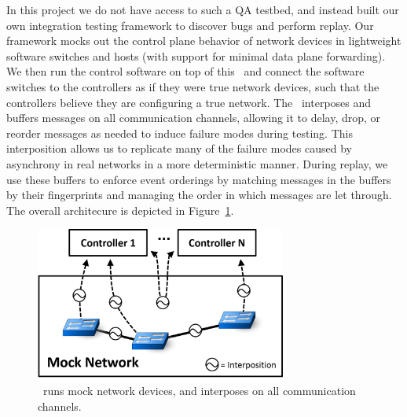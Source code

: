 In this project we do not have access to such a QA testbed, and instead built our own
integration testing framework to discover bugs and
perform replay. Our framework mocks out the control plane
behavior of network devices in lightweight software switches and hosts (with
support for minimal data plane forwarding).
We then run the control software on
top of this \tester~and connect the software switches to the controllers as if they were true
network devices, such that the controllers believe they are configuring a true
network. The \tester~interposes and buffers messages on all communication
channels, allowing it to delay, drop, or reorder
messages as needed to induce failure modes during testing. This interposition
allows us to replicate many of the failure modes caused by asynchrony in real
networks in a more deterministic manner. During
replay, we use these buffers to enforce event orderings by
matching messages in the buffers by their fingerprints and managing
the order in which messages are let through. The overall architecure is depicted in
Figure~\ref{fig:architecture}.

\begin{figure}[tb]
    \includegraphics[width=3.25in]{../diagrams/architecture/Debugger_Architecture.png}
    \caption[]{\label{fig:architecture} \projectname~runs mock
    network devices, and interposes on all communication
    channels. }
\end{figure}


